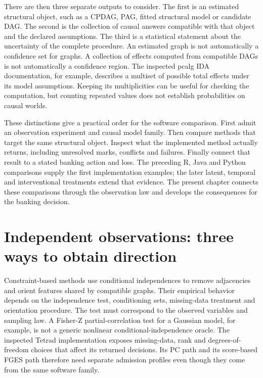 There are then three separate outputs to consider. The first is an estimated
structural object, such as a CPDAG, PAG, fitted structural model or candidate
DAG. The second is the collection of causal answers compatible with that
object and the declared assumptions. The third is a statistical statement
about the uncertainty of the complete procedure. An estimated graph is not
automatically a confidence set for graphs. A collection of effects computed
from compatible DAGs is not automatically a confidence region. The inspected
pcalg IDA documentation, for example, describes a multiset of possible total
effects under its model assumptions. Keeping its multiplicities can be useful
for checking the computation, but counting repeated values does not establish
probabilities on causal worlds. \citep{exec13_pcalg,exec13_pcalg_reuse_primary}

These distinctions give a practical order for the software comparison. First
admit an observation experiment and causal model family. Then compare methods
that target the same structural object. Inspect what the implemented method
actually returns, including unresolved marks, conflicts and failures. Finally
connect that result to a stated banking action and loss. The preceding
R, Java and Python comparisons supply the first implementation examples;
the later latent, temporal and interventional treatments extend that evidence.
The present chapter connects these comparisons through the observation law
and develops the consequences for the banking decision.

\section{Independent observations: three ways to obtain direction}

Constraint-based methods use conditional independences to remove adjacencies
and orient features shared by compatible graphs. Their empirical behavior
depends on the independence test, conditioning sets, missing-data treatment
and orientation procedure. The test must correspond to the observed variables
and sampling law. A Fisher-Z partial-correlation test for a Gaussian model,
for example, is not a generic nonlinear conditional-independence oracle.
The inspected Tetrad implementation exposes missing-data, rank and
degrees-of-freedom choices that affect its returned decisions. Its PC path
and its score-based FGES path therefore need separate admission profiles even
though they come from the same software family. \citep{exec13_java_tetrad}

